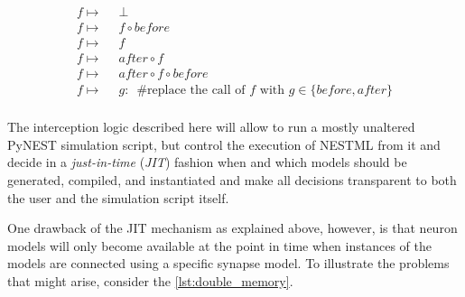 \begin{align*}
  f \mapsto & \enspace\bot                                                                       \\
  f \mapsto & \enspace f \circ before                                                                   \\
  f \mapsto & \enspace f                                                                                \\
  f \mapsto & \enspace after \circ f                                                                    \\
  f \mapsto & \enspace after \circ f \circ before                                                       \\
  f \mapsto & \enspace g:\enspace \text{\#replace the call of } f \text{ with } g \in \{before, after\} \\
\end{align*}

The interception logic described here will allow to run a mostly unaltered PyNEST simulation script, but control the execution of NESTML from it and decide in a \emph{just-in-time} (\emph{JIT}) fashion when and which models should be generated, compiled, and instantiated and make all decisions transparent to both the user and the simulation script itself.

One drawback of the JIT mechanism as explained above, however, is that neuron models will only become available at the point in time when instances of the models are connected using a specific synapse model. To illustrate the problems that might arise, consider the \autoref{lst:double_memory}.


